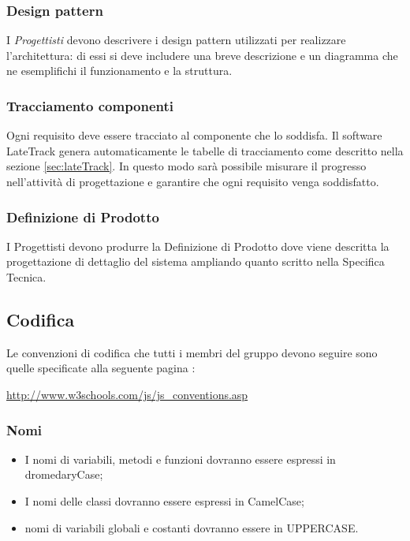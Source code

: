 	\subsubsection{Design pattern}
	I \textit{Progettisti} devono descrivere i design pattern utilizzati per realizzare l'architettura:
	di essi si deve includere una breve descrizione e un diagramma che ne esemplifichi il funzionamento e la struttura.
	\subsubsection{Tracciamento componenti}
	Ogni requisito deve essere tracciato al componente che lo soddisfa. Il software LateTrack genera automaticamente le tabelle di tracciamento come descritto nella sezione \ref{sec:lateTrack}. In questo modo sarà possibile misurare il progresso nell'attività di progettazione e garantire che ogni requisito venga soddisfatto.
	\subsubsection{Definizione di Prodotto}
	I Progettisti devono produrre la Definizione di Prodotto dove viene descritta la progettazione di dettaglio del sistema ampliando quanto scritto nella Specifica Tecnica.
	
	
	\subsection{Codifica}
	Le convenzioni di codifica che tutti i membri del gruppo devono seguire sono quelle
	specificate alla seguente pagina :\\
	\begin{center} \url{http://www.w3schools.com/js/js_conventions.asp} \end{center}
	\subsubsection{Nomi}
	\begin{itemize}
	\item I nomi di variabili, metodi e funzioni dovranno essere espressi in dromedaryCase;
	\item I nomi delle classi dovranno essere espressi in CamelCase;
	\item nomi di variabili globali e costanti dovranno essere in UPPERCASE.
	\end{itemize}
